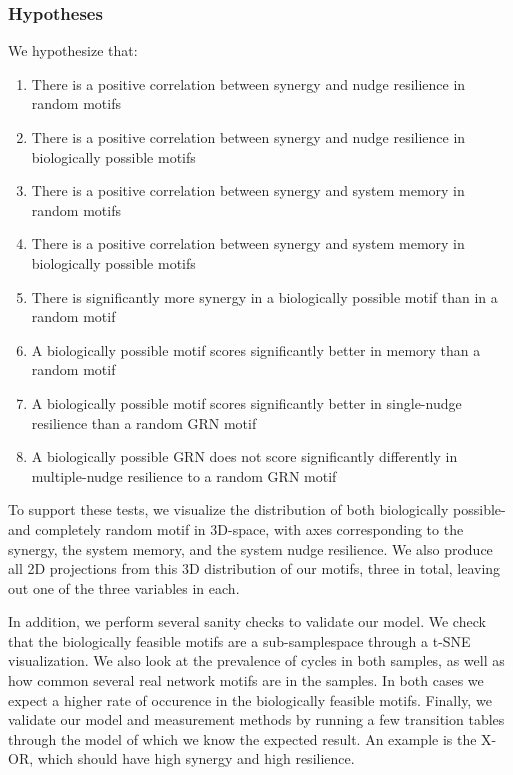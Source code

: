 \documentclass[../main.tex]{subfiles}
\begin{document}
\subsubsection{Hypotheses}

We hypothesize that:

\begin{enumerate}
\itemsep0em 
\item There is a positive correlation between synergy and nudge resilience in random motifs
\item There is a positive correlation between synergy and nudge resilience in biologically possible motifs
\item There is a positive correlation between synergy and system memory in random motifs
\item There is a positive correlation between synergy and system memory in biologically possible motifs
\item There is significantly more synergy in a biologically possible motif than in a random motif
\item A biologically possible motif scores significantly better in memory than a random motif
\item A biologically possible motif scores significantly better in single-nudge resilience than a random GRN motif
\item A biologically possible GRN does not score significantly differently in multiple-nudge resilience to a random GRN motif
\end{enumerate}

To support these tests, we visualize the distribution of both biologically possible- and completely random motif in 3D-space, with axes corresponding to the synergy, the system memory, and the system nudge resilience.
We also produce all 2D projections from this 3D distribution of our motifs, three in total, leaving out one of the three variables in each.

In addition, we perform several sanity checks to validate our model.
We check that the biologically feasible motifs are a sub-samplespace through a t-SNE visualization.
We also look at the prevalence of cycles in both samples, as well as how common several real network motifs are in the samples.
In both cases we expect a higher rate of occurence in the biologically feasible motifs.
Finally, we validate our model and measurement methods by running a few transition tables through the model of which we know the expected result.
An example is the X-OR, which should have high synergy and high resilience.
\end{document}
